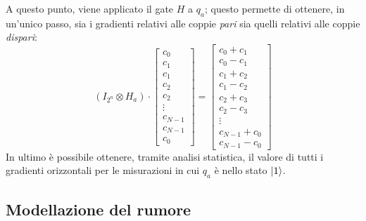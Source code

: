 A questo punto, viene applicato il gate $H$ a $q_a$; questo permette
di ottenere, in un'unico passo, sia i gradienti relativi alle coppie \emph{pari} sia quelli relativi alle coppie \emph{dispari}:
\begin{equation}
	(I_{2^n} \otimes H_a) \cdot \begin{bmatrix}
		c_0\\c_1\\c_1\\c_2\\c_2\\\vdots\\c_{N-1}\\c_{N-1}\\c_0
	\end{bmatrix} = \begin{bmatrix}
		c_0+c_1\\c_0-c_1\\c_1+c_2\\c_1-c_2\\c_2+c_3\\c_2-c_3\\\vdots\\c_{N-1}+c_0\\c_{N-1}-c_0
	\end{bmatrix}
	\label{eq:h-to-adj-qubit}
\end{equation}
In ultimo è possibile ottenere, tramite analisi statistica, il valore di tutti i
gradienti orizzontali per le misurazioni in cui $q_a$ è nello stato $\lvert1\rangle$.

\subsection{Modellazione del rumore}
